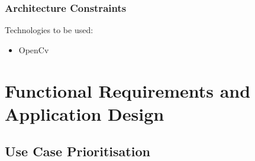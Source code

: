 \documentclass[a4paper,12pt]{report}
\begin{document}
 \subsubsection{Architecture Constraints}
	Technologies to be used:
		\begin{itemize}
			\item OpenCv
			\\
		\end{itemize}
\newpage
\section{Functional Requirements and Application Design}
\subsection{Use Case Prioritisation}
\end{document}
